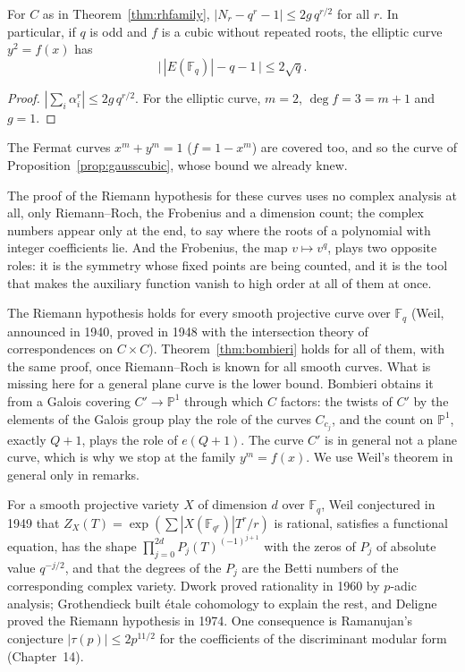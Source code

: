 \begin{corollary}[Hasse, 1933]\label{cor:hasse}
For $C$ as in Theorem~\ref{thm:rhfamily}, $|N_r-q^r-1|\le2g\,q^{r/2}$ for all $r$. In particular, if $q$ is odd and $f$ is a cubic without repeated roots,
the elliptic curve $y^2=f(x)$ has
\[
\bigl|\,|E(\mathbb F_q)|-q-1\,\bigr|\le2\sqrt q.
\]
\end{corollary}
\begin{proof}
$|\sum_i\alpha_i^r|\le2g\,q^{r/2}$. For the elliptic curve, $m=2$, $\deg f=3=m+1$ and $g=1$.
\end{proof}

The Fermat curves $x^m+y^m=1$ ($f=1-x^m$) are covered too, and so the curve of Proposition~\ref{prop:gausscubic}, whose bound we already knew.

\begin{beauty}
The proof of the Riemann hypothesis for these curves uses no complex analysis at all, only Riemann--Roch, the Frobenius and a dimension count; the complex numbers
appear only at the end, to say where the roots of a polynomial with integer coefficients lie. And the Frobenius, the map $v\mapsto v^q$, plays two opposite roles:
it is the symmetry whose fixed points are being counted, and it is the tool that makes the auxiliary function vanish to high order at all of them at once.
\end{beauty}

\begin{remark}
The Riemann hypothesis holds for every smooth projective curve over $\mathbb F_q$ (Weil, announced in 1940, proved in 1948 with the intersection theory of
correspondences on $C\times C$). Theorem~\ref{thm:bombieri} holds for all of them, with the same proof, once Riemann--Roch is known for all smooth curves. What is
missing here for a general plane curve is the lower bound. Bombieri obtains it from a Galois covering $C'\to\mathbb P^1$ through which $C$ factors: the
twists of $C'$ by the elements of the Galois group play the role of the curves $C_{c_j}$, and the count on $\mathbb P^1$, exactly $Q+1$, plays the role of
$e(Q+1)$. The curve $C'$ is in general not a plane curve, which is why we stop at the family $y^m=f(x)$. We use Weil's theorem in general only in remarks.
\end{remark}

\begin{remark}
For a smooth projective variety $X$ of dimension $d$ over $\mathbb F_q$, Weil conjectured in 1949 that $Z_X(T)=\exp(\sum|X(\mathbb F_{q^r})|T^r/r)$ is rational,
satisfies a functional equation, has the shape $\prod_{j=0}^{2d}P_j(T)^{(-1)^{j+1}}$ with the zeros of $P_j$ of absolute value $q^{-j/2}$, and that the degrees of the
$P_j$ are the Betti numbers of the corresponding complex variety. Dwork proved rationality in 1960 by $p$-adic analysis; Grothendieck built \'etale cohomology to
explain the rest, and Deligne proved the Riemann hypothesis in 1974. One consequence is Ramanujan's conjecture $|\tau(p)|\le2p^{11/2}$ for the coefficients of the
discriminant modular form (Chapter~14).
\end{remark}

